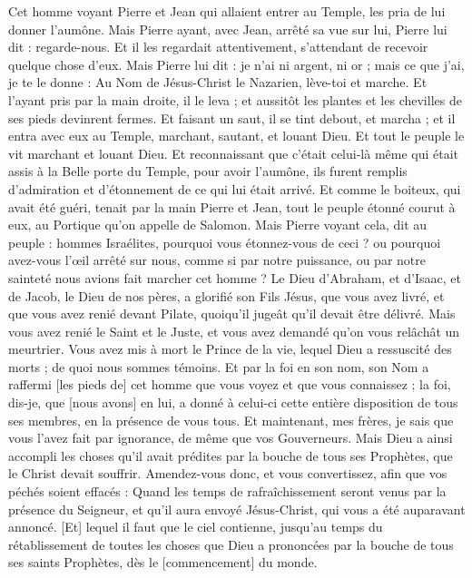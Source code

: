 \begin{multicols}{2}
Cet homme voyant Pierre et Jean qui allaient entrer au Temple, les pria de lui donner l'aumône.
Mais Pierre ayant, avec Jean, arrêté sa vue sur lui, Pierre lui dit : regarde-nous.
Et il les regardait attentivement, s'attendant de recevoir quelque chose d'eux.
Mais Pierre lui dit : je n'ai ni argent, ni or ; mais ce que j'ai, je te le donne : Au Nom de Jésus-Christ le Nazarien, lève-toi et marche.
Et l'ayant pris par la main droite, il le leva ; et aussitôt les plantes et les chevilles de ses pieds devinrent fermes.
Et faisant un saut, il se tint debout, et marcha ; et il entra avec eux au Temple, marchant, sautant, et louant Dieu.
Et tout le peuple le vit marchant et louant Dieu.
Et reconnaissant que c'était celui-là même qui était assis à la Belle porte du Temple, pour avoir l'aumône, ils furent remplis d'admiration et d'étonnement de ce qui lui était arrivé.
Et comme le boiteux, qui avait été guéri, tenait par la main Pierre et Jean, tout le peuple étonné courut à eux, au Portique qu'on appelle de Salomon.
Mais Pierre voyant cela, dit au peuple : hommes Israélites, pourquoi vous étonnez-vous de ceci ? ou pourquoi avez-vous l'œil arrêté sur nous, comme si par notre puissance, ou par notre sainteté nous avions fait marcher cet homme ?
Le Dieu d'Abraham, et d'Isaac, et de Jacob, le Dieu de nos pères, a glorifié son Fils Jésus, que vous avez livré, et que vous avez renié devant Pilate, quoiqu'il jugeât qu'il devait être délivré.
Mais vous avez renié le Saint et le Juste, et vous avez demandé qu'on vous relâchât un meurtrier.
Vous avez mis à mort le Prince de la vie, lequel Dieu a ressuscité des morts ; de quoi nous sommes témoins.
Et par la foi en son nom, son Nom a raffermi [les pieds de] cet homme que vous voyez et que vous connaissez ; la foi, dis-je, que [nous avons] en lui, a donné à celui-ci cette entière disposition de tous ses membres, en la présence de vous tous.
Et maintenant, mes frères, je sais que vous l'avez fait par ignorance, de même que vos Gouverneurs.
Mais Dieu a ainsi accompli les choses qu'il avait prédites par la bouche de tous ses Prophètes, que le Christ devait souffrir.
Amendez-vous donc, et vous convertissez, afin que vos péchés soient effacés :
Quand les temps de rafraîchissement seront venus par la présence du Seigneur, et qu'il aura envoyé Jésus-Christ, qui vous a été auparavant annoncé.
[Et] lequel il faut que le ciel contienne, jusqu'au temps du rétablissement de toutes les choses que Dieu a prononcées par la bouche de tous ses saints Prophètes, dès le [commencement] du monde.

\end{multicols}
